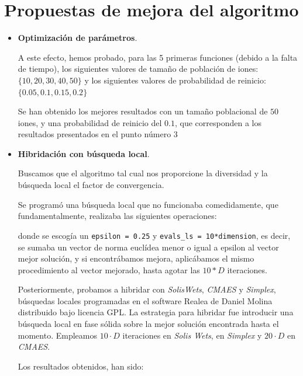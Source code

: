\documentclass[a4paper,11pt]{article}
\begin{document}
\section{Propuestas de mejora del algoritmo}
\begin{itemize}
 \item \textbf{Optimización de parámetros}.
 
 A este efecto, hemos probado, para las 5 primeras funciones (debido a la falta de tiempo), los siguientes valores de tamaño
 de población de iones: $\big\{10, 20, 30, 40, 50\big\}$ y los siguientes valores de probabilidad de reinicio: $\big\{0.05, 0.1, 0.15, 0.2\big\}$
 
 Se han obtenido los mejores resultados con un tamaño poblacional de $50$ iones, y una probabilidad de reinicio del $0.1$, que corresponden
 a los resultados presentados en el punto número 3
 
 \item \textbf{Hibridación con búsqueda local}.
 
 Buscamos que el algoritmo tal cual nos proporcione la diversidad y la búsqueda local el factor de convergencia. 
 
 
 Se programó una búsqueda local que no funcionaba comedidamente, que fundamentalmente, realizaba las siguientes operaciones:
 
  \small{\texttt{}}
  \normalsize
  
  donde se escogía un \texttt{epsilon = 0.25} y \texttt{evals\_ls = 10*dimension}, es decir, se sumaba un vector de norma euclídea
  menor o igual a epsilon al vector mejor solución, y si encontrábamos mejora, aplicábamos el mismo procedimiento al vector mejorado,
  hasta agotar las $10*D$ iteraciones.
  
 Posteriormente, probamos a hibridar con \textit{SolisWets}, \textit{CMAES} y \textit{Simplex}, búsquedas locales programadas en el software Realea de Daniel Molina distribuido
 bajo licencia GPL. La estrategia para hibridar fue introducir una búsqueda local en fase sólida sobre la mejor solución
 encontrada hasta el momento. Empleamos $10\cdot D$ iteraciones en \textit{Solis Wets}, en \textit{Simplex} y $20\cdot D$ en \textit{CMAES}.
 
 
 Los resultados obtenidos, han sido:
 

\end{itemize}
\end{document}
